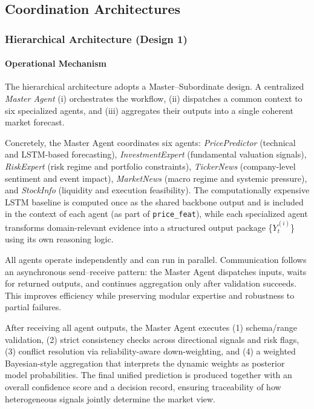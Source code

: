 \documentclass{ieeeaccess}
\begin{document}
\subsection{Coordination Architectures}
\subsubsection{Hierarchical Architecture (Design 1)}

\paragraph{Operational Mechanism}
The hierarchical architecture adopts a Master--Subordinate design. A centralized \textit{Master Agent} (i) orchestrates the workflow, (ii) dispatches a common context to six specialized agents, and (iii) aggregates their outputs into a single coherent market forecast.

Concretely, the Master Agent coordinates six agents: \textit{PricePredictor} (technical and LSTM-based forecasting), \textit{InvestmentExpert} (fundamental valuation signals), \textit{RiskExpert} (risk regime and portfolio constraints), \textit{TickerNews} (company-level sentiment and event impact), \textit{MarketNews} (macro regime and systemic pressure), and \textit{StockInfo} (liquidity and execution feasibility). The computationally expensive LSTM baseline is computed once as the shared backbone output and is included in the context of each agent (as part of \texttt{price\_feat}), while each specialized agent transforms domain-relevant evidence into a structured output package \{$Y_t^{(i)}$\} using its own reasoning logic.

All agents operate independently and can run in parallel. Communication follows an asynchronous send--receive pattern: the Master Agent dispatches inputs, waits for returned outputs, and continues aggregation only after validation succeeds. This improves efficiency while preserving modular expertise and robustness to partial failures.

After receiving all agent outputs, the Master Agent executes (1) schema/range validation, (2) strict consistency checks across directional signals and risk flags, (3) conflict resolution via reliability-aware down-weighting, and (4) a weighted Bayesian-style aggregation that interprets the dynamic weights as posterior model probabilities. The final unified prediction is produced together with an overall confidence score and a decision record, ensuring traceability of how heterogeneous signals jointly determine the market view.
\end{document}
